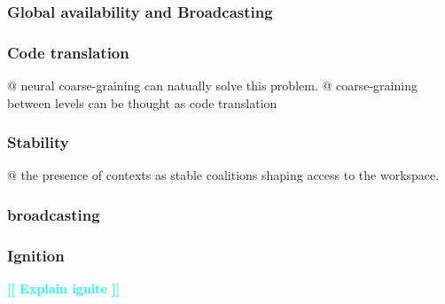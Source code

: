 \documentclass[utf8]{article}
\newenvironment{ants}
			{
			 \begin{easylist}[itemize]
			}
			{
			\end{easylist}
			}
\newcommand{\toWrite}[1]{\noindent
			\textcolor{Cyan}{\textbf{[[ #1 ]]}}}
\begin{document}
			\subsubsection{Global availability and Broadcasting}
			
			\subsubsection{Code translation}
				\begin{ants}
					@ neural coarse-graining can natually solve this problem. 
					@ coarse-graining between levels can be thought as code translation
				\end{ants}
			
			
			\subsubsection{Stability}
				\begin{ants}
					@ the presence of contexts as stable coalitions shaping access to the workspace.
					
				\end{ants}
			
			
			\subsubsection{broadcasting}
			
			\subsubsection{Ignition}
				\toWrite{Explain ignite}
\end{document}
